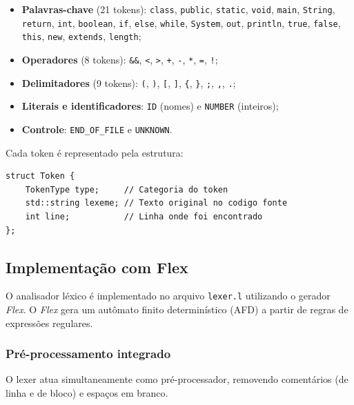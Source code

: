 \documentclass[a4paper, 12pt]{article}
\begin{document}
\begin{itemize}
    \item \textbf{Palavras-chave} (21 tokens): \texttt{class}, \texttt{public}, \texttt{static}, \texttt{void}, \texttt{main}, \texttt{String}, \texttt{return}, \texttt{int}, \texttt{boolean}, \texttt{if}, \texttt{else}, \texttt{while}, \texttt{System}, \texttt{out}, \texttt{println}, \texttt{true}, \texttt{false}, \texttt{this}, \texttt{new}, \texttt{extends}, \texttt{length};

    \item \textbf{Operadores} (8 tokens): \texttt{\&\&}, \texttt{<}, \texttt{>}, \texttt{+}, \texttt{-}, \texttt{*}, \texttt{=}, \texttt{!};

    \item \textbf{Delimitadores} (9 tokens): \texttt{(}, \texttt{)}, \texttt{[}, \texttt{]}, \texttt{\{}, \texttt{\}}, \texttt{;}, \texttt{,}, \texttt{.};

    \item \textbf{Literais e identificadores}: \texttt{ID} (nomes) e \texttt{NUMBER} (inteiros);

    \item \textbf{Controle}: \texttt{END\_OF\_FILE} e \texttt{UNKNOWN}.
\end{itemize}

Cada token \'e representado pela estrutura:

\begin{lstlisting}[style=cpp]
struct Token {
    TokenType type;     // Categoria do token
    std::string lexeme; // Texto original no codigo fonte
    int line;           // Linha onde foi encontrado
};
\end{lstlisting}

\subsection{Implementa\c{c}\~ao com Flex}

O analisador l\'exico \'e implementado no arquivo \texttt{lexer.l} utilizando o gerador \textit{Flex}. O \textit{Flex} gera um aut\^omato finito determin\'istico (AFD) a partir de regras de express\~oes regulares.

\subsubsection{Pr\'e-processamento integrado}

O lexer atua simultaneamente como pr\'e-processador, removendo coment\'arios (de linha e de bloco) e espa\c{c}os em branco.
\end{document}
